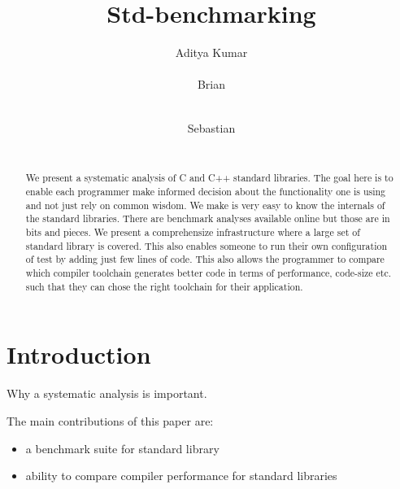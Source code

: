 \documentclass{sig-alternate}
\begin{document}
\def \GCC {GCC}
\def \LLVM {LLVM}

\setlength{\pdfpageheight}{\paperheight}
\setlength{\pdfpagewidth}{\paperwidth}

\title{Std-benchmarking}


\author{
\alignauthor
Aditya Kumar\\
       \\
\alignauthor
Brian\\
       \\
\and
\alignauthor
Sebastian\\
       \\
}

\maketitle
\begin{abstract}
We present a systematic analysis of C and C++ standard libraries. The goal
here is to enable each programmer make informed decision about the functionality
one is using and not just rely on common wisdom. We make is very easy to know
the internals of the standard libraries. There are benchmark analyses available
online but those are in bits and pieces. We present a comprehensize infrastructure
where a large set of standard library is covered. This also enables someone
to run their own configuration of test by adding just few lines of code. This also
allows the programmer to compare which compiler toolchain generates better code
in terms of performance, code-size etc. such that they can chose the right
toolchain for their application.
\end{abstract}

\section{Introduction}
Why a systematic analysis is important.

The main contributions of this paper are:
\begin{itemize}
\item a benchmark suite for standard library
\item ability to compare compiler performance for standard libraries
\end{itemize}
\end{document}
